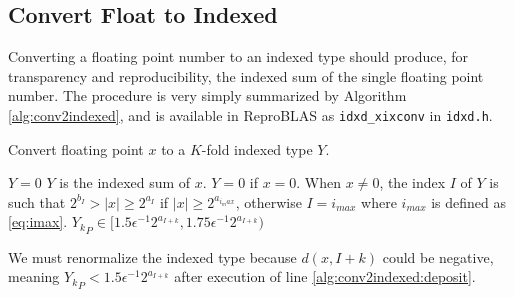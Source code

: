 \subsection{Convert Float to Indexed}
    \label{sec:primitiveops_conv2indexed}
    Converting a floating point number to an indexed type should produce, for
    transparency and reproducibility, the indexed sum of the single floating
    point number.
    The procedure is very simply summarized by Algorithm \ref{alg:conv2indexed}, and is available in ReproBLAS as \texttt{idxd_xixconv} in \texttt{idxd.h}.

    \begin{samepage}
    \begin{alg}
      Convert floating point $x$ to a $K$-fold indexed type $Y$.
      \begin{algorithmic}[1]
          \State $Y = 0$
          \State {}
          \State {} \label{alg:conv2indexed:deposit}
          \State {}
        \EndFunction
        \Ensure
          $Y$ is the indexed sum of $x$. $Y=0$ if $x=0$.
          When $x \neq 0$, the index $I$ of $Y$ is such that $2^{b_I} > |x| \geq 2^{a_I}$
          if $|x| \geq 2^{a_{i_max}}$, otherwise $I = i_{max}$ where $i_{max}$ is defined as \eqref{eq:imax}.
          ${Y_k}_P \in [1.5  \epsilon^{-1} 2^{a_{I + k}}, 1.75  \epsilon^{-1} 2^{a_{I + k}})$
      \end{algorithmic}
      \label{alg:conv2indexed}
    \end{alg}
    \end{samepage}

    We must renormalize the indexed type because $d(x, I + k)$ could be
    negative, meaning ${Y_k}_P < 1.5  \epsilon^{-1} 2^{a_{I + k}}$ after
    execution of line \ref{alg:conv2indexed:deposit}.
